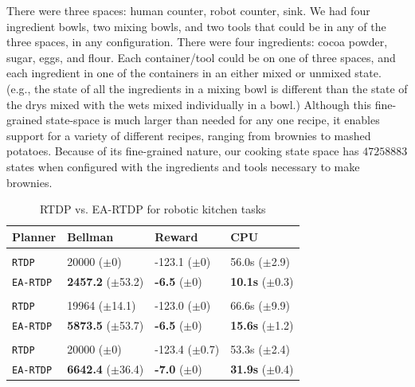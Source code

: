 \documentclass[letterpaper]{article}
\newcommand{\ra}[1]{\renewcommand{\arraystretch}{#1}} %
\begin{document}
There were three spaces: human counter, robot counter, sink.  We had
four ingredient bowls, two mixing bowls, and two tools that could be
in any of the three spaces, in any configuration.  There were four
ingredients: cocoa powder, sugar, eggs, and flour.  Each
container/tool could be on one of three spaces, and each ingredient in
one of the containers in an either mixed or unmixed state.  (e.g., the
state of all the ingredients in a mixing bowl is different than the
state of the drys mixed with the wets mixed individually in a bowl.)
Although this fine-grained state-space is much larger than needed for
any one recipe, it enables support for a variety of different recipes,
ranging from brownies to mashed potatoes.  Because of its
fine-grained nature, our cooking state space has
$\num[round-precision=3, round-mode=figures]{47258883}$ states when
configured with the ingredients and tools necessary to make brownies.

\begin{table}[t]
\ra{1.1}
\small
\begin{tabular}{@{}llll@{}}\toprule
Planner & Bellman & Reward & CPU \\ \midrule
&\hspace{-10mm}{\it Dry Ingredients} \\
\texttt{RTDP} 	& 20000 ($\pm$0) 			& {-123.1} ($\pm$0)  & {56.0s}   ($\pm$2.9) \\
\texttt{EA-RTDP} 	& {\bf 2457.2} ($\pm$53.2) 		& {\bf -6.5}   ($\pm$0) & {\bf 10.1s}   ($\pm$0.3) \\  \hline
&\hspace{-10mm}{\it Wet Ingredients} \\
\texttt{RTDP} 	& 19964 ($\pm$14.1) 			& { -123.0}   ($\pm$0) & 66.6s   ($\pm$9.9) \\
\texttt{EA-RTDP} 	& {\bf 5873.5} ($\pm$53.7) 		& {\bf -6.5}   ($\pm$0) & {\bf 15.6s}   ($\pm$1.2) \\ \hline
&\hspace{-10mm}{\it Brownie Batter} \\
\texttt{RTDP} 	& 20000 ($\pm$0) 			& -123.4   ($\pm$0.7) & { 53.3s}   ($\pm$2.4) \\
\texttt{EA-RTDP} 	& {\bf 6642.4} ($\pm$36.4) 		& {\bf -7.0}   ($\pm$0) & {\bf 31.9s}   ($\pm$0.4) \\ 
\bottomrule
\end{tabular}
\caption{RTDP vs. EA-RTDP for robotic kitchen tasks}
\label{table:baxter_results}
\end{table}
\end{document}
